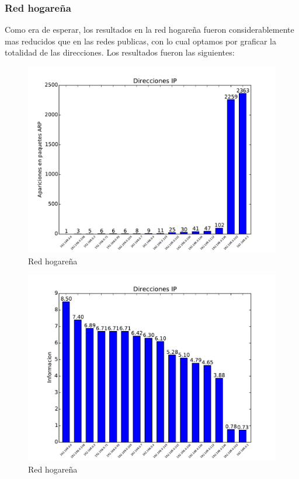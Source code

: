 \subsubsection{Red hogareña}

Como era de esperar, los resultados en la red hogareña fueron considerablemente mas reducidos que en las redes publicas, con lo cual optamos por graficar la totalidad de las direcciones. Los resultados fueron las siguientes:

\begin{figure}[H]
\begin{center}
\includegraphics[width=0.8\columnwidth]{graficos/hogar_s2.pdf}
\caption{Red hogareña}
\end{center}
\end{figure}

\begin{figure}[H]
\begin{center}
\includegraphics[width=0.8\columnwidth]{graficos/hogar_inf_s2.pdf}
\caption{Red hogareña}
\end{center}
\end{figure}

